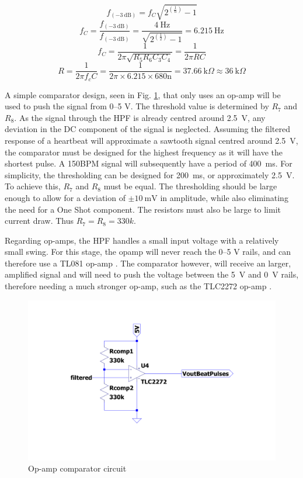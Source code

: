 \begin{equation}
    f_{(\SI{-3}{\deci\bel})} = f_{C} \sqrt{2^{(\frac{1}{n})}-1}
    \label{eq:3dBFreq}
\end{equation}
\[      f_{C} = \frac{f_{(\SI{-3}{\deci\bel})}}{f_{(\SI{-3}{\deci\bel})}}  =   \frac{\SI{4}{\hertz}}{\sqrt{2^{(\frac{1}{2})}-1}} = \SI{6.215}{\hertz} \]
\begin{equation}
    f_{C} = \frac{1}{2 \pi \sqrt{R_{5}R_{6}C_{3}C_{4}}} = \frac{1}{2\pi R C}
    \label{eq:LPFCutoffFreq}
\end{equation}
\[      R = \frac{1}{2 \pi f_{c} C} = \frac{1}{2 \pi \times 6.215 \times 680 \si{\nano}} = \SI{37.66}{\kilo\Omega} \approx \SI{36}{\kilo\Omega}  \]\par

A simple comparator design, seen in Fig. \ref{fig:Comparator}, that only uses an op-amp will be used to push the signal from \numrange{0}{5} \si{\volt}. The threshold value is determined by $R_{7}$ and $R_{8}$. As the signal through the HPF is already centred around \SI{2.5}{\volt}, any deviation in the DC component of the signal is neglected. Assuming the filtered response of a heartbeat will approximate a sawtooth signal centred around \SI{2.5}{\volt}, the comparator must be designed for the highest frequency as it will have the shortest pulse. A 150BPM signal will subsequently have a period of \SI{400}{\milli\second}. For simplicity, the thresholding can be designed for \SI{200}{\milli\second}, or approximately \SI{2.5}{\volt}. To achieve this, $R_{7}$ and $R_{8}$ must be equal. The thresholding should be large enough to allow for a deviation of $\pm\SI{10}{\milli\volt}$ in amplitude, while also eliminating the need for a One Shot component. The resistors must also be large to limit current draw. Thus $R_{7}=R_{8}=330k$.\par
Regarding op-amps, the HPF handles a small input voltage with a relatively small swing. For this stage, the opamp will never reach the \numrange{0}{5} \si{\volt} rails, and can therefore use a TL081 op-amp \cite{TL081}. The comparator however, will receive an larger, amplified signal and will need to push the voltage between the \SI{5}{\volt} and \SI{0}{\volt} rails, therefore needing a much stronger op-amp, such as the TLC2272 op-amp \cite{TLC2272}.

\begin{figure}[H]
    \centering
    \includegraphics[width = 0.4\linewidth]{./Figures/CompCircuit_cropped.pdf}
    \caption[Comparator Circuit Diagram]{Op-amp comparator circuit}
    \label{fig:Comparator}
\end{figure}

